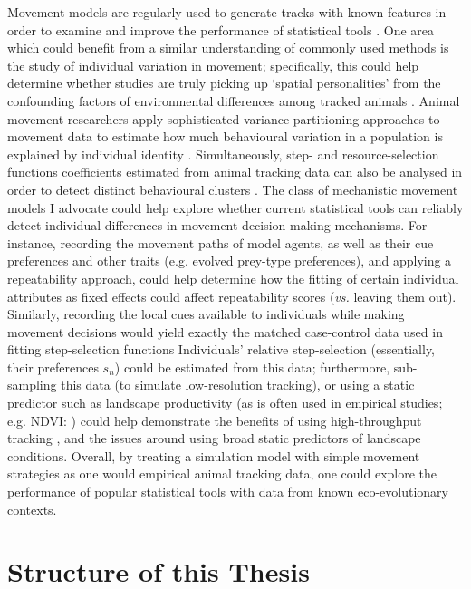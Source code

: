 Movement models are regularly used to generate tracks with known features in order to examine and improve the performance of statistical tools \parencite[such as segmentation algorithms; see e.g.][]{gurarie2016,michelot2016,patin2020a}.
One area which could benefit from a similar understanding of commonly used methods is the study of individual variation in movement; specifically, this could help determine whether studies are truly picking up `spatial personalities' from the confounding factors of environmental differences among tracked animals \parencite{stuber2022,spiegel2022}.
Animal movement researchers apply sophisticated variance-partitioning approaches to movement data to estimate how much behavioural variation in a population is explained by individual identity \parencite[especially using `repeatability analysis'][]{hertel2020, hertel2019, hertel2021,nakagawa2010}.
Simultaneously, step- and resource-selection functions coefficients estimated from animal tracking data can also be analysed in order to detect distinct behavioural clusters \parencite{bastille-rousseau2019}.
The class of mechanistic movement models I advocate could help explore whether current statistical tools can reliably detect individual differences in movement decision-making mechanisms.
For instance, recording the movement paths of model agents, as well as their cue preferences and other traits (e.g. evolved prey-type preferences), and applying a repeatability approach, could help determine how the fitting of certain individual attributes as fixed effects could affect repeatability scores (\emph{vs.} leaving them out).
Similarly, recording the local cues available to individuals while making movement decisions would yield exactly the matched case-control data used in fitting step-selection functions \parencite[see][]{signer2019}
Individuals' relative step-selection (essentially, their preferences $s_n$) could be estimated from this data; furthermore, sub-sampling this data (to simulate low-resolution tracking), or using a static predictor such as landscape productivity (as is often used in empirical studies; e.g. NDVI: \cite{pettorelli2011}) could help demonstrate the benefits of using high-throughput tracking \parencite{nathan2022}, and the issues around using broad static predictors of landscape conditions.
Overall, by treating a simulation model with simple movement strategies as one would empirical animal tracking data, one could explore the performance of popular statistical tools with data from known eco-evolutionary contexts.

\section*{Structure of this Thesis}

